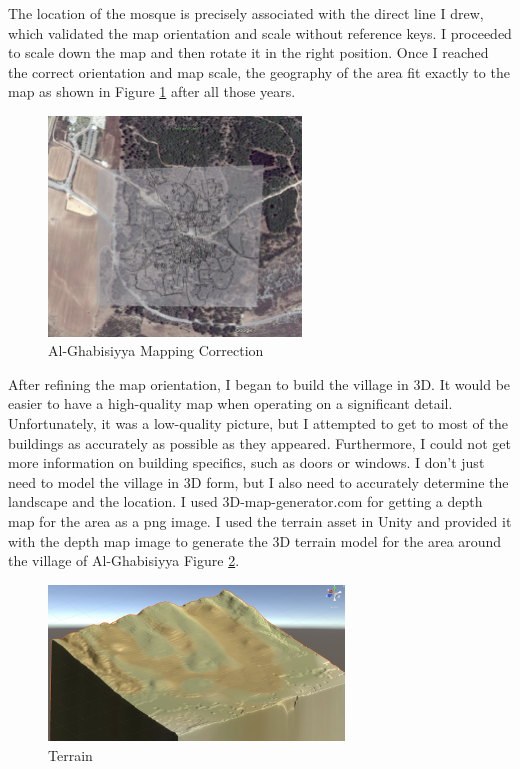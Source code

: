 The location of the mosque is precisely associated with the direct line I drew, which validated the map orientation and scale without reference keys. I proceeded to scale down the map and then rotate it in the right position. Once I reached the correct orientation and map scale, the geography of the area fit exactly to the map as shown in Figure \ref{fig:scale} after all those years.


\begin{figure}[ht]
    \centering
    \includegraphics[width=0.60\textwidth]{images/scale.png}
    \caption{Al-Ghabisiyya Mapping Correction}
    \label{fig:scale}
\end{figure} 
 
After refining the map orientation, I began to build the village in 3D. It would be easier to have a high-quality map when operating on a significant detail. Unfortunately, it was a low-quality picture, but I attempted to get to most of the buildings as accurately as possible as they appeared. Furthermore, I could not get more information on building specifics, such as doors or windows. I don't just need to model the village in 3D form, but I also need to accurately determine the landscape and the location. I used 3D-map-generator.com for getting a depth map for the area as a \acrfull{png} image. I used the terrain asset in Unity and provided it with the depth map image to generate the 3D terrain model for the area around the village of Al-Ghabisiyya Figure \ref{fig:terr}.

\begin{figure}[ht]
    \centering
    \includegraphics[width=0.70\textwidth]{images/terr.png}
    \caption{Terrain}
    \label{fig:terr}
\end{figure} 



